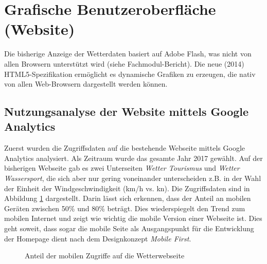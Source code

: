 \section{Grafische Benutzeroberfläche (Website)}
Die bisherige Anzeige der Wetterdaten basiert auf Adobe Flash, was nicht von allen Browsern unterstützt wird (siehe Fachmodul-Bericht). Die neue (2014) HTML5-Spezifikation ermöglicht es dynamische Grafiken zu erzeugen, die nativ von allen Web-Browsern dargestellt werden können.


\subsection{Nutzungsanalyse der Website mittels Google Analytics}
\label{subsec:googleAnalytics}
Zuerst wurden die Zugriffsdaten auf die bestehende Webseite mittels Google Analytics analysiert. Als Zeitraum wurde das gesamte Jahr 2017 gewählt. Auf der bisherigen Webseite gab es zwei Unterseiten \textit{Wetter Tourismus} und \textit{Wetter Wassersport}, die sich aber nur gering voneinander unterscheiden z.B. in der Wahl der Einheit der Windgeschwindigkeit (km/h vs. kn). Die Zugriffsdaten sind in Abbildung \ref{img:google_mobile} dargestellt. Darin lässt sich erkennen, dass der Anteil an mobilen Geräten zwischen 50\% und 80\% beträgt. Dies wiederspiegelt den Trend zum mobilen Internet und zeigt wie wichtig die mobile Version einer Webseite ist. Dies geht soweit, dass sogar die mobile Seite als Ausgangspunkt für die Entwicklung der Homepage dient nach dem Designkonzept \textit{Mobile First}.

\begin{figure}[h!]
	\centering
	\caption{Anteil der mobilen Zugriffe auf die Wetterwebseite}
	\label{img:google_mobile}
\end{figure}

